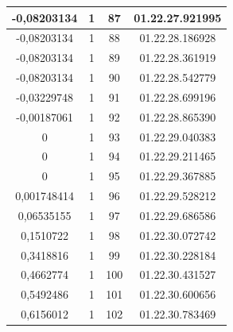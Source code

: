 \begin{table}[]
\begin{tabular}{|c|c|c|c|}
-0,08203134                      & 1                              & 87                      & 01.22.27.921995            \\ \hline
-0,08203134                      & 1                              & 88                      & 01.22.28.186928            \\ \hline
-0,08203134                      & 1                              & 89                      & 01.22.28.361919            \\ \hline
-0,08203134                      & 1                              & 90                      & 01.22.28.542779            \\ \hline
-0,03229748                      & 1                              & 91                      & 01.22.28.699196            \\ \hline
-0,00187061                      & 1                              & 92                      & 01.22.28.865390            \\ \hline
0                                & 1                              & 93                      & 01.22.29.040383            \\ \hline
0                                & 1                              & 94                      & 01.22.29.211465            \\ \hline
0                                & 1                              & 95                      & 01.22.29.367885            \\ \hline
0,001748414                      & 1                              & 96                      & 01.22.29.528212            \\ \hline
0,06535155                       & 1                              & 97                      & 01.22.29.686586            \\ \hline
0,1510722                        & 1                              & 98                      & 01.22.30.072742            \\ \hline
0,3418816                        & 1                              & 99                      & 01.22.30.228184            \\ \hline
0,4662774                        & 1                              & 100                     & 01.22.30.431527            \\ \hline
0,5492486                        & 1                              & 101                     & 01.22.30.600656            \\ \hline
0,6156012                        & 1                              & 102                     & 01.22.30.783469            \\ \hline

\end{tabular}
\end{table}
